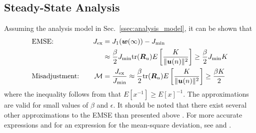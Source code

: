 \subsection{Steady-State Analysis}
Assuming the analysis model in Sec.~\ref{ssec:analysis_model}, it can be shown that \cite[p.~327]{Sayed2003}
\begin{alignat}{2}
  &\text{EMSE:}&\quad J_\textup{ex} &= J_1(\boldsymbol{w}(\infty))-J_\textup{min}\notag\\
  & &\quad &\approx \frac{\beta}{2} J_\textup{min}\textup{tr}(\boldsymbol{R}_u)E\left[\frac{K}{\|\boldsymbol{u}(n)\|^2}\right]\geq\frac{\beta}{2} J_\textup{min}K\\
  &\text{Misadjustment:}&\quad \mathcal{M} &= \frac{ J_\textup{ex}}{J_\textup{min}} \approx \frac{\beta}{2}\textup{tr}(\boldsymbol{R}_u)E\left[\frac{K}{\|\boldsymbol{u}(n)\|^2}\right]\geq\frac{\beta K}{2}
\end{alignat}
where the inequality follows from that $E[x^{-1}]\geq E[x]^{-1}$. The approximations are valid for small values of $\beta$ and $\epsilon$. It should be noted that there exist several other approximations to the EMSE than presented above \cite[p.~325]{Sayed2003}. For more accurate expressions and for an expression for the mean-square deviation, see \cite[pp.~510--512]{Sayed2003} and \cite{Shin2004}.

